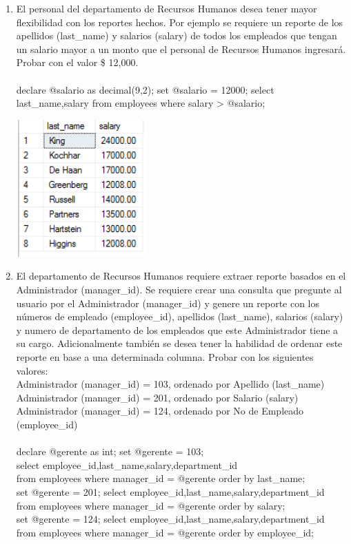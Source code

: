 \begin{enumerate}[1.]
	\item El personal del departamento de Recursos Humanos desea tener mayor flexibilidad con los reportes hechos. Por ejemplo se requiere un reporte de los apellidos (last\_name) y salarios (salary) de todos los empleados que tengan un salario mayor a un monto que el personal de Recursos Humanos ingresará. Probar con el valor \$ 12,000.
	\\ \\declare @salario as decimal(9,2); set @salario = 12000; select last\_name,salary from employees where salary > @salario;

	\begin{center}
	\includegraphics[width=5cm]{./Imagenes/actividad_04_10} 
	\end{center}

	\item El departamento de Recursos Humanos requiere extraer reporte basados en el Administrador (manager\_id). Se requiere crear una consulta que pregunte al usuario por el Administrador (manager\_id) y genere un reporte con los números de empleado (employee\_id), apellidos (last\_name), salarios (salary) y numero de departamento de los empleados que este Administrador tiene a su cargo. Adicionalmente también se desea tener la habilidad de ordenar este reporte en base a una determinada columna. Probar con los siguientes valores:
	\\Administrador (manager\_id) = 103, ordenado por Apellido (last\_name)
	\\Administrador (manager\_id) = 201, ordenado por Salario (salary)
	\\Administrador (manager\_id) = 124, ordenado por No de Empleado (employee\_id)
	\\ \\declare @gerente as int; set @gerente = 103;
	\\select employee\_id,last\_name,salary,department\_id 
	\\from employees where manager\_id = @gerente order by last\_name; 
	\\set @gerente = 201; select employee\_id,last\_name,salary,department\_id 
	\\from employees where manager\_id = @gerente order by salary; 
	\\set @gerente = 124; select employee\_id,last\_name,salary,department\_id 
	\\from employees where manager\_id = @gerente order by employee\_id;


\end{enumerate}
